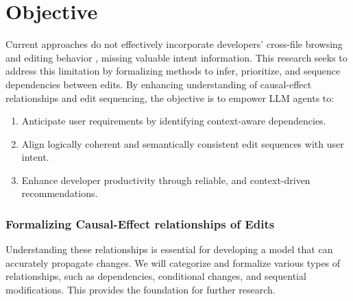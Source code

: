 
\newpage
\section{Objective}

Current approaches do not effectively incorporate developers’ cross-file browsing and editing behavior \cite{guan2024contextmodule}, missing valuable intent information. This research seeks to address this limitation by formalizing methods to infer, prioritize, and sequence dependencies between edits. By enhancing understanding of causal-effect relationships and edit sequencing, the objective is to empower LLM agents to:

\begin{enumerate}
    \item Anticipate user requirements by identifying context-aware dependencies.
    \item Align logically coherent and semantically consistent edit sequences with user intent.
    \item Enhance developer productivity through reliable, and context-driven recommendations.
\end{enumerate}



\subsubsection{Formalizing Causal-Effect relationships of Edits}

Understanding these relationships is essential for developing a model that can accurately propagate changes. We will categorize and formalize various types of relationships, such as dependencies, conditional changes, and sequential modifications. This provides the foundation for further research.

